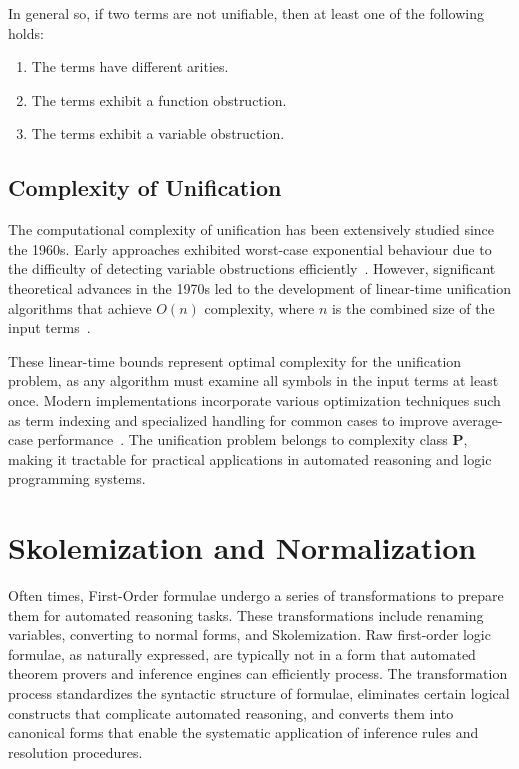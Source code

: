 In general so, if two terms are not unifiable, then at least one of the following holds:
\begin{enumerate}
    \item The terms have different arities.
    \item The terms exhibit a function obstruction.
    \item The terms exhibit a variable obstruction.
\end{enumerate}


\subsection{Complexity of Unification}
The computational complexity of unification has been extensively studied since the 1960s.
Early approaches exhibited worst-case exponential behaviour due to the difficulty of detecting variable obstructions efficiently~\cite{robinson1965}.
However, significant theoretical advances in the 1970s led to the development of linear-time unification algorithms that achieve \(O(n)\) complexity, where \(n\) is the combined size of the input terms~\cite{martelli1976, paterson1978}.

These linear-time bounds represent optimal complexity for the unification problem, as any algorithm must examine all symbols in the input terms at least once.
Modern implementations incorporate various optimization techniques such as term indexing and specialized handling for common cases to improve average-case performance~\cite{baader2001}.
The unification problem belongs to complexity class \textbf{P}, making it tractable for practical applications in automated reasoning and logic programming systems.


\section{Skolemization and Normalization}\label{sec:skolemization_and_normalization}

Often times, First-Order formulae undergo a series of transformations to prepare them for automated reasoning tasks.
These transformations include renaming variables, converting to normal forms, and Skolemization.
Raw first-order logic formulae, as naturally expressed, are typically not in a form that automated theorem provers and inference engines can efficiently process.
The transformation process standardizes the syntactic structure of formulae, eliminates certain logical constructs that complicate automated reasoning, and converts them into canonical forms that enable the systematic application of inference rules and resolution procedures.

